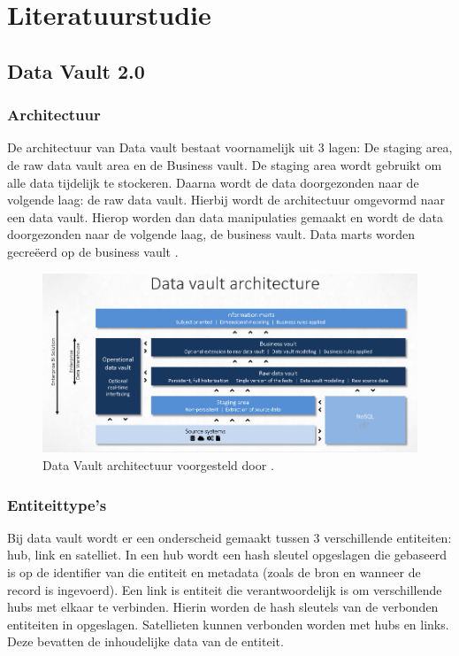 \section{Literatuurstudie}
\label{sec:state-of-the-art}
\subsection{Data Vault 2.0}
\subsubsection{Architectuur}
De architectuur van Data vault bestaat voornamelijk uit 3 lagen: De staging area, de raw data vault area en de Business vault. De staging area wordt gebruikt om alle data tijdelijk te stockeren. Daarna wordt de data doorgezonden naar de volgende laag: de raw data vault. Hierbij wordt de architectuur omgevormd naar een data vault. Hierop worden dan data manipulaties gemaakt en wordt de data doorgezonden naar de volgende laag, de business vault. Data marts worden gecreëerd op de business vault \autocite{Linstedt2015}.

\begin{figure}[h]
	\centering
	\includegraphics[scale=0.345]{../images/DVArchitectuur.png}
	\caption{Data Vault architectuur voorgesteld door \textcite{Stroobants2018}.}
	\label{fig:dvarch}
\end{figure}

\subsubsection{Entiteittype's}
Bij data vault wordt er een onderscheid gemaakt tussen 3 verschillende entiteiten: hub, link en satelliet. In een hub wordt een hash sleutel opgeslagen die gebaseerd is op de identifier van die entiteit en metadata (zoals de bron en wanneer de record is ingevoerd). Een link is entiteit die verantwoordelijk is om verschillende hubs met elkaar te verbinden. Hierin worden de hash sleutels van de verbonden entiteiten in opgeslagen. Satellieten kunnen verbonden worden met hubs en links. Deze bevatten de inhoudelijke data van de entiteit.  

